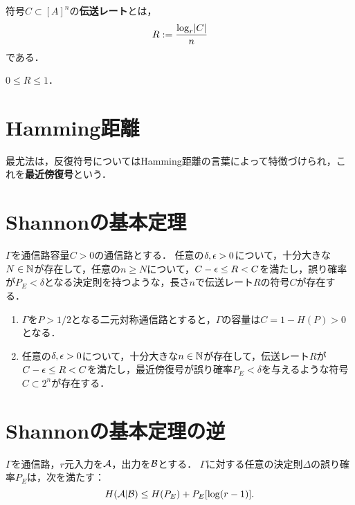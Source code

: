 \documentclass[uplatex,dvipdfmx]{jsreport}
\begin{document}
\begin{definition}
    符号$C\subset [A]^n$の\textbf{伝送レート}とは，
    \[R:=\frac{\log_r\lvert C\rvert}{n}\]
    である．
\end{definition}

\begin{lemma}
    $0\le R\le 1$．
\end{lemma}

\section{Hamming距離}

\begin{tcolorbox}[colframe=ForestGreen, colback=ForestGreen!10!white,breakable,colbacktitle=ForestGreen!40!white,coltitle=black,fonttitle=\bfseries\sffamily,
title=]
    最尤法は，反復符号についてはHamming距離の言葉によって特徴づけられ，これを\textbf{最近傍復号}という．
\end{tcolorbox}

\section{Shannonの基本定理}

\begin{theorem}
    $\Gamma$を通信路容量$C>0$の通信路とする．
    任意の$\delta,\epsilon>0$について，十分大きな$N\in\mathbb{N}$が存在して，任意の$n\ge N$について，$C-\epsilon\le R<C$を満たし，誤り確率が$P_E<\delta$となる決定則を持つような，長さ$n$で伝送レート$R$の符号$C$が存在する．
\end{theorem}


\begin{corollary}\mbox{}
    \begin{enumerate}
        \item $\Gamma$を$P>1/2$となる二元対称通信路とすると，$\Gamma$の容量は$C=1-H(P)>0$となる．
        \item 任意の$\delta,\epsilon>0$について，十分大きな$n\in\mathbb{N}$が存在して，伝送レート$R$が$C-\epsilon\le R<C$を満たし，最近傍復号が誤り確率$P_E<\delta$を与えるような符号$C\subset2^n$が存在する．
    \end{enumerate}
\end{corollary}

\section{Shannonの基本定理の逆}

\begin{theorem}
    $\Gamma$を通信路，$r$元入力を$\mathcal{A}$，出力を$\mathcal{B}$とする．
    $\Gamma$に対する任意の決定則$\Delta$の誤り確率$P_E$は，次を満たす：
    \[H(\mathcal{A}|\mathcal{B})\le H(P_E)+P_E[\log(r-1)].\]
\end{theorem}
\end{document}
